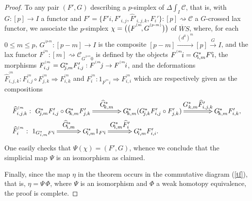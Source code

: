 \documentclass[]{amsart}
\begin{document}
\begin{proof}
 To any pair $(F',G)$ describing a $p$-simplex of ${\ensuremath{\Delta}}\int_I\!{\ensuremath{\mathcal{C}}}$, that is, with $G:[p]\to I$ a functor and $F'=\{F'\!i,F'_{i,j},\widehat{F}'_{i,j,k},\widehat{F}_i'\}
 :[p]\rightsquigarrow{\ensuremath{\mathcal{C}}}$ a $G$-crossed lax
 functor, we associate the $p$-simplex
 $\chi=\big(\big(F^{^{(m}}\hspace{-2pt},G^{^{(p\text{-}m)}}\big)\big)$ of $\overline{W}S$, where, for each $0\leq m\leq p$,
 $G^{^{(p\text{-}m}}:[p-m]\to I$ is the
 composite $[p-m]\overset{(d^0)^{m}}\to [p] \overset{ G}\to I$,
and the lax functor $F^{^{(m}}:[m]\rightsquigarrow {\ensuremath{\mathcal{C}}}_{G^{^{(p\text{-}m}}\!0}$ is defined by the
objects $F^{^{(m}}\!i=G_{\hspace{-2pt}i,m}^*F'\!i$, the morphisms
$F^{^{(m}}_{i,j}=G_{\hspace{-2pt}j,m}^*F'_{i,j}:F^{^{(m}}\!{j}\to F^{^{(m}}\!{i}$, and the
deformations $\widehat{F}^{^{(m}}_{i,j,k}:F^{^{(m}}_{i,j}\circ F^{^{(m}}_{j,k}\Rightarrow
F^{^{(m}}_{i,k}$ and $F^{^{(m}}_{i}:1_{F^{^{(m}}\!i}\Rightarrow F^{^{(m}}_{i,i}$ which are
respectively given as the compositions
$$\begin{array}{l}
\xymatrix@C=42pt{\widehat{F}^{^{(m}}_{i,j,k}:\ G^*_{\hspace{-2pt}j,m}F'_{i,j}\circ G^*_{\hspace{-2pt}k,m}F'_{j,k}\ar@{=>}[r]^-{\textstyle \widehat{G}_{\hspace{-2pt}k,m}^*}&G^*_{\hspace{-2pt}k,m}(G^*_{\hspace{-2pt}j,k}F'_{i,j}\circ F'_{j,k})\ar@{=>}[r]^-{\textstyle G_{k,m}^*\widehat{F}'_{i,j,k}}&G^*_{\hspace{-2pt}k,m}F'_{i,k},}\\[4pt]
\xymatrix@C=35pt{\widehat{F}^{^{(m}}_{i}: \ 1_{G^*_{i,m}F'\!i}\ar@{=>}[r]^-{\textstyle
\widehat{G}^*_{\hspace{-2pt}i,m}}&G^*_{\hspace{-2pt}i,m}1_{F'\!i}\ar@{=>}[r]^-{\textstyle
G^*_{\hspace{-2pt}i,m}\widehat{F}'_i}&G_{\hspace{-2pt}i,m}^*F'_{i,i}.}
\end{array}
$$
One easily checks that $\Psi(\chi)=(F',G)$, whence we conclude that the simplicial map $\Psi$ is an
isomorphism as claimed.

Finally, since the map $\eta$ in the theorem occurs in the commutative diagram (\ref{tf}), that is,
$\eta=\Psi\,\Phi$, where $\Psi$ is an isomorphism and $\Phi$ a weak homotopy equivalence, the proof
is complete.
\end{proof}
\end{document}

